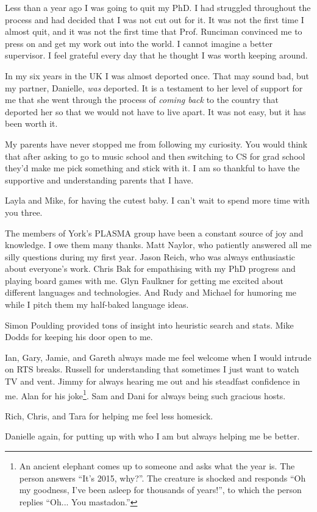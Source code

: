 Less than a year ago I was going to quit my PhD. I had struggled throughout the
process and had decided that I was not cut out for it. It was not the first
time I almost quit, and it was not the first time that Prof. Runciman convinced
me to press on and get my work out into the world. I cannot imagine a better
supervisor. I feel grateful every day that he thought I
was worth keeping around.

In my six years in the UK I was almost deported once. That may sound bad, but
my partner, Danielle, \emph{was} deported. It is a testament to her level of
support for me that she went through the process of \emph{coming back} to the
country that deported her so that we would not have to live apart. It was not
easy, but it has been worth it.

My parents have never stopped me from following my curiosity. You would think
that after asking to go to music school and then switching to CS for grad
school they'd make me pick something and stick with it. I am so thankful to
have the supportive and understanding parents that I have.

Layla and Mike, for having the cutest baby. I can't wait to spend more time
with you three.

The members of York's PLASMA group have been a constant source of joy and
knowledge. I owe them many thanks. Matt Naylor, who patiently answered all me
silly questions during my first year. Jason Reich, who was always enthusiastic
about everyone's work. Chris Bak for empathising with my PhD progress and
playing board games with me. Glyn Faulkner for getting me excited about
different languages and technologies. And Rudy and Michael for humoring me
while I pitch them my half-baked language ideas.

Simon Poulding provided tons of insight into heuristic search and stats. Mike Dodds
for keeping his door open to me.

Ian, Gary, Jamie, and Gareth always made me feel welcome when I would intrude
on RTS breaks. Russell for understanding that sometimes I just want to watch TV
and vent. Jimmy for always hearing me out and his steadfast confidence in me.
Alan for his joke\footnote{An ancient elephant comes up to someone and asks
what the year is.  The person answers ``It's 2015, why?''. The creature is
shocked and responds ``Oh my goodness, I've been asleep for thousands of
years!'', to which the person replies ``Oh... You mastadon.''}. Sam and Dani
for always being such gracious hosts.

Rich, Chris, and Tara for helping me feel less homesick.

Danielle again, for putting up with who I am but always helping me be better.
